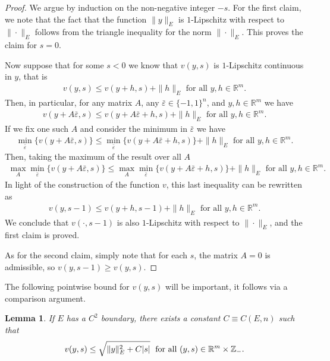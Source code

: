 \documentclass[reqno]{amsart}
\newtheorem{lemma}[theorem]{Lemma}
\numberwithin{equation}{section}
\begin{document}
\begin{proof}
  We argue by induction on the non-negative integer $-s$. For the first claim, we note that the fact that the function $\|y\|_E$ is $1$-Lipschitz with respect to $\|\cdot\|_E$ follows from the triangle inequality for the norm $\|\cdot\|_E$. This proves the claim for $s=0$. 
  
  Now suppose that for some $s<0$ we know that $v(y,s)$ is $1$-Lipschitz continuous in $y$, that is
  \begin{align*}
    v(y,s) \leq v(y+h,s)+ \|h\|_E  \text{ for all } y,h\in\mathbb{R}^m.
  \end{align*}
  Then, in particular, for any matrix $A$, any $\bar \varepsilon \in \{-1,1\}^n$, and $y,h \in \mathbb{R}^m$ we have
  \begin{align*}
    v(y+A\bar \varepsilon,s) \leq v(y+A\bar \varepsilon+h,s)+ \|h\|_E  \text{ for all } y,h\in\mathbb{R}^m.
  \end{align*}
  If we fix one such $A$ and consider the minimum in $\bar \varepsilon$ we have
  \begin{align*}
    \min_{\bar \varepsilon} \{ v(y+A\bar \varepsilon,s)\} \leq \min_{\bar \varepsilon} \{ v(y+A\bar \varepsilon+h,s) \} + \|h\|_E  \text{ for all } y,h\in\mathbb{R}^m.
  \end{align*}
  Then, taking the maximum of the result over all $A$
  \begin{align*}
    \max_A \min_{\bar \varepsilon} \{ v(y+A\bar \varepsilon,s)\} \leq \max_A \min_{\bar \varepsilon} \{ v(y+A\bar \varepsilon+h,s) \} + \|h\|_E  \text{ for all } y,h\in\mathbb{R}^m.
  \end{align*}
  In light of the construction of the function $v$, this last inequality can be rewritten as 
  \begin{align*}
    v(y,s-1) \leq v(y+h,s-1) + \|h\|_E \text{ for all } y,h\in\mathbb{R}^m.
  \end{align*}
  We conclude that $v(\cdot,s-1)$ is also $1$-Lipschitz with respect to $\|\cdot\|_E$, and the first claim is proved.

  As for the second claim, simply note that for each $s$, the matrix $A = 0$ is admissible, so $v(y,s-1) \geq v(y,s)$.


\end{proof}

The following pointwise bound for $v(y,s)$ will be important, it follows via a comparison argument.

\begin{lemma}\label{lemma:bound for the value function}
  If $E$ has a $C^2$ boundary, there exists a constant $C \equiv C(E,n)$ such that
  \begin{align*}
    v(y,s) \leq \sqrt{ \|y\|_E^2 + C|s|}\; \textnormal{ for all } (y,s) \in \mathbb{R}^m\times \mathbb{Z}_-.
  \end{align*}

\end{lemma}
\end{document}
